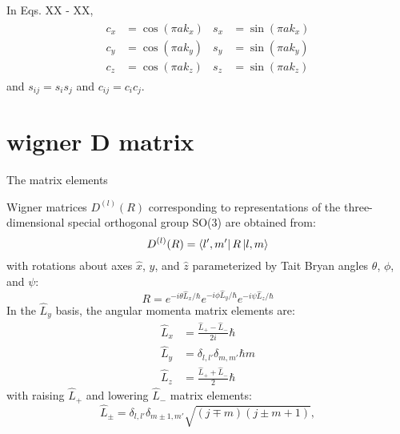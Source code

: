 \documentclass[twocolumn,showpacs,preprintnumbers,superscriptaddress,prb,floatfix,aps,10pt]{revtex4-1}
\begin{document}
In Eqs. XX - XX,
\begin{align}
\begin{split}
c_x &= \cos(\pi a k_x) \\
c_y &= \cos(\pi a k_y) \\
c_z &= \cos(\pi a k_z)
\end{split}
\begin{split}
s_x &= \sin(\pi a k_x) \\
s_y &= \sin(\pi a k_y) \\
s_z &= \sin(\pi a k_z)
\end{split}
\end{align}
and
$s_{ij} = s_i s_j$ and $c_{ij} = c_i c_j$.





%
%
\section{wigner D matrix} \label{appendix:wigner}




The matrix elements


Wigner matrices $D^{(l)}(R)$ corresponding to representations of the three-dimensional special orthogonal group SO(3) are obtained from:\cite{martin_electronic_2004}
\begin{equation}
\label{eq:imselfenergy}
D^{(l)}(R) = \bra{l',m'} R \ket{l,m}
\end{equation}
with rotations about axes $\hat{x}$, $\hat{y}$, and $\hat{z}$ parameterized by Tait Bryan angles $\theta$, $\phi$, and $\psi$:
\begin{equation}
R = e^{-i\theta\hat{L}_x/\hbar} e^{-i\phi\hat{L}_y/\hbar} e^{-i\psi\hat{L}_z/\hbar}
\end{equation}
%
In the $\hat{L}_y$ basis, the angular momenta matrix elements are:\cite{shankar_fundamentals_2014}
\begin{align}
\label{eq:angular_momenta}
\hat{L}_x & = \frac{\hat{L}_{+}-\hat{L}_{-}}{2i} \hbar \\
\hat{L}_y & = \delta_{l,l'}\delta_{m,m'} \hbar m \\
\hat{L}_z & = \frac{\hat{L}_{+}+\hat{L}_{-}}{2} \hbar
\end{align}
with raising $\hat{L}_+$ and lowering $\hat{L}_-$ matrix elements:
\begin{equation}
\label{eq:raising_lowering_operator}
\hat{L}_{\pm} = \delta_{l,l'}\delta_{m\pm1,m'} \sqrt{(j\mp m)(j\pm m+1)} ,
\end{equation}
\end{document}
